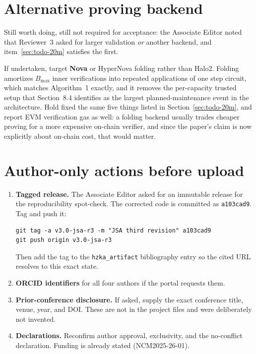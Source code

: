 \documentclass[11pt,a4paper]{article}
\begin{document}
\section{Alternative proving backend}
\label{sec:todo-backend}

Still worth doing, still not required for acceptance: the Associate Editor
noted that Reviewer~3 asked for larger validation \emph{or} another backend,
and item~\ref{sec:todo-20m} satisfies the first.

If undertaken, target \textbf{Nova} or HyperNova folding rather than Halo2.
Folding amortizes $B_{\max}$ inner verifications into repeated applications of
one step circuit, which matches Algorithm~1 exactly, and it removes the
per-capacity trusted setup that Section~8.4 identifies as the largest
planned-maintenance event in the architecture. Hold fixed the same five things
listed in Section~\ref{sec:todo-20m}, and report EVM verification gas as well:
a folding backend usually trades cheaper proving for a more expensive on-chain
verifier, and since the paper's claim is now explicitly about on-chain cost,
that would matter.

\section{Author-only actions before upload}
\label{sec:todo-portal}

\begin{enumerate}[leftmargin=*,itemsep=3pt]
  \item \textbf{Tagged release.} The Associate Editor asked for an immutable
  release for the reproducibility spot-check. The corrected code is committed as
  \texttt{a103cad9}. Tag and push it:
  \begin{lstlisting}
git tag -a v3.0-jsa-r3 -m "JSA third revision" a103cad9
git push origin v3.0-jsa-r3
  \end{lstlisting}
  Then add the tag to the \texttt{hzka\_artifact} bibliography entry so the
  cited URL resolves to this exact state.
  \item \textbf{ORCID identifiers} for all four authors if the portal requests
  them.
  \item \textbf{Prior-conference disclosure.} If asked, supply the exact
  conference title, venue, year, and DOI. These are not in the project files
  and were deliberately not invented.
  \item \textbf{Declarations.} Reconfirm author approval, exclusivity, and the
  no-conflict declaration. Funding is already stated (NCM2025-26-01).
\end{enumerate}
\end{document}
